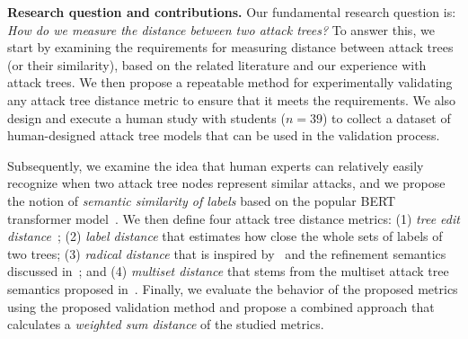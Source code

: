 



\textbf{Research question and contributions.} 
Our fundamental research question is: \emph{How do we measure the distance between two attack trees?} 
To answer this, we start by examining the requirements for measuring distance between attack trees (or their similarity), based on the related literature and our experience with attack trees. We then propose a repeatable method for experimentally validating any attack tree distance metric to ensure that it meets the requirements. We also design and execute a human study with students ($n=39$) to collect a dataset of human-designed attack tree models that can be used in the validation process.

Subsequently, we examine the idea that human experts can relatively easily recognize when two attack tree nodes represent similar attacks, and we propose the notion of \emph{semantic similarity of labels} based on the popular BERT transformer model~\cite{devlin2018bert}. We then define four attack tree distance metrics: (1) \emph{tree edit distance}~\cite{zhang_editing_1992}; (2) \emph{label distance} that estimates how close the whole sets of labels of two trees; (3) \emph{radical distance} that is inspired by~\cite{schiele2021novel} and the refinement semantics discussed in~\cite{gadyatskayaRefinementAwareGenerationAttack2017}; and (4) \emph{multiset distance} that stems from the multiset attack tree semantics proposed in~\cite{mauwFoundationsAttackTrees2006}. Finally, we evaluate the behavior of the proposed metrics using the proposed validation method and propose a combined approach that calculates a \emph{weighted sum distance} of the studied metrics.

